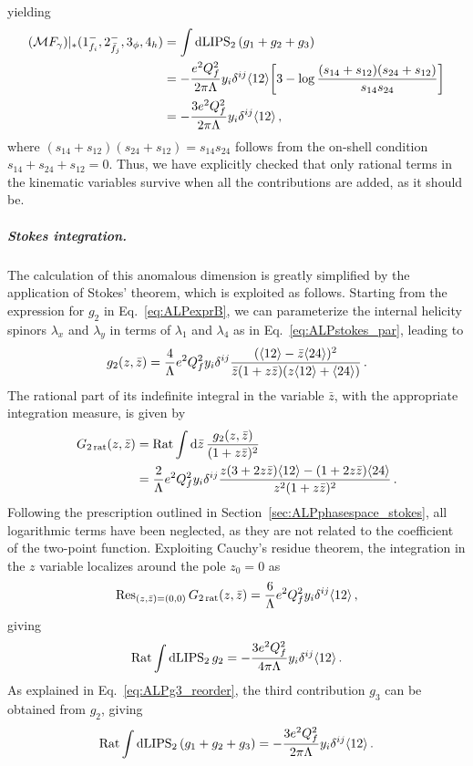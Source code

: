 yielding
\begin{align}
    (\mathcal M F_\gamma)|_*(1_{f_i}^-,2_{\bar f_j}^-,3_\phi,4_h) &= \int \text{dLIPS}_2\,(g_1+g_2+g_3)
    \nonumber \\ &= -\frac{e^2Q_f^2}{2\pi\Lambda}y_i \delta^{ij} \langle 1 2 \rangle\bigg[3-\log\frac{(s_{14}+s_{12})(s_{24}+s_{12})}{s_{14} s_{24}}\bigg]\nonumber \\
    &= -\frac{3e^2Q_f^2}{2\pi\Lambda}y_i \delta^{ij} \langle 1 2 \rangle\,,
\end{align}
where $(s_{14}+s_{12})(s_{24}+s_{12})=s_{14}s_{24}$ follows from the on-shell condition
$s_{14}+s_{24}+s_{12}=0$.
Thus, we have explicitly checked that only rational terms in the kinematic variables survive
when all the contributions are added, as it should be.

\subparagraph{Stokes integration.}
The calculation of this anomalous dimension is greatly simplified by the application of Stokes'
theorem, which is exploited as follows.
Starting from the expression for $g_2$ in Eq.~\eqref{eq:ALPexprB}, we can parameterize the
internal helicity spinors $\lambda_x$ and $\lambda_y$ in terms of $\lambda_1$ and $\lambda_4$
as in Eq.~\eqref{eq:ALPstokes_par}, leading to
\begin{equation}
    g_2(z,\bar z) = \frac{4}{\Lambda}e^2 Q_f^2 y_i\delta^{ij}\frac{(\langle 1 2 \rangle-\bar z \langle 2 4 \rangle)^2}{\bar z (1+z\bar z )(z\langle 1 2 \rangle+\langle 2 4 \rangle)}\,.
\end{equation}
The rational part of its indefinite integral in the variable $\bar z$, with the appropriate
integration measure, is given by
\begin{align}
  G_{2\,\text{rat}}(z,\bar z)
  &= \text{Rat}  \int \text{d} \bar z\, \frac{g_2(z,\bar z)}{(1+z\bar z)^2}  \nonumber \\
  &= \frac{2}{\Lambda}e^2 Q_f^2 y_i\delta^{ij} \frac{z(3+2z\bar z)\langle 1 2 \rangle-(1+2z\bar z)\langle 2 4 \rangle}{z^2(1+z\bar z)^2}\, .
\end{align}
Following the prescription outlined in Section~\ref{sec:ALPphasespace_stokes}, all logarithmic
terms have been neglected, as they are not related to the coefficient of the two-point
function.
Exploiting Cauchy's residue theorem, the integration in the $z$ variable localizes around the
pole $z_0=0$ as
\begin{equation}
    \Res_{(z,\bar z) = (0,0)}G_{2\,\text{rat}}(z,\bar z) =  \frac{6}{\Lambda}e^2 Q_f^2 y_i\delta^{ij}\agl{1}{2} \, ,
\end{equation}
giving
\begin{equation}
   {\rm Rat}\int \text{dLIPS}_2\, g_2
   =  -\frac{3 e^2 Q_f^2}{4\pi\Lambda}y_i\delta^{ij}\langle 1 2 \rangle \,.
   \label{eq:ALPg2_contr}
\end{equation}
As explained in Eq.~\eqref{eq:ALPg3_reorder}, the third contribution $g_3$ can be obtained from
$g_2$, giving
\begin{equation}
{\rm Rat}\int \text{dLIPS}_2\,(g_1+g_2+g_3) =  -\frac{3 e^2 Q_f^2}{2\pi\Lambda}y_i\delta^{ij}\langle 1 2 \rangle \,.
   \label{eq:ALPg3_contr}
\end{equation}

